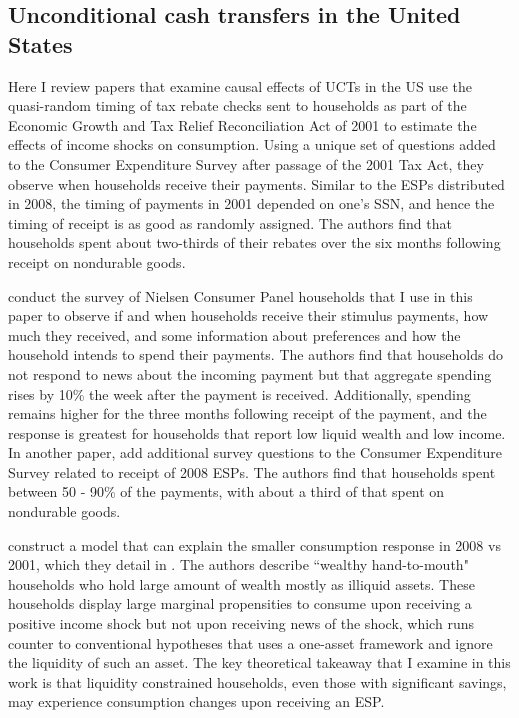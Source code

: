 \documentclass[12pt]{article}
\begin{document}
\subsection{Unconditional cash transfers in the United States}

Here I review papers that examine causal effects of UCTs in the US \textcite{johnson2006household} use the quasi-random timing of tax rebate checks sent to households as part of the Economic Growth and Tax Relief Reconciliation Act of 2001 to estimate the effects of income shocks on consumption.
Using a unique set of questions added to the Consumer Expenditure Survey after passage of the 2001 Tax Act, they observe when households receive their payments.
Similar to the ESPs distributed in 2008, the timing of payments in 2001 depended on one's SSN, and hence the timing of receipt is as good as randomly assigned.
The authors find that households spent about two-thirds of their rebates over the six months following receipt on nondurable goods.

\textcite{broda2014economic} conduct the survey of Nielsen Consumer Panel households that I use in this paper to observe if and when households receive their stimulus payments, how much they received, and some information about preferences and how the household intends to spend their payments.
The authors find that households do not respond to news about the incoming payment but that aggregate spending rises by 10\% the week after the payment is received.
Additionally, spending remains higher for the three months following receipt of the payment, and the response is greatest for households that report low liquid wealth and low income.
In another paper, \textcite{parker2013consumer} add additional survey questions to the Consumer Expenditure Survey related to receipt of 2008 ESPs.
The authors find that households spent between 50 - 90\% of the payments, with about a third of that spent on nondurable goods.

\textcite{kaplan2014model} construct a model that can explain the smaller consumption response in 2008 vs 2001, which they detail in \textcite{kaplan2014tale}.
The authors describe ``wealthy hand-to-mouth" households who hold large amount of wealth mostly as illiquid assets.
These households display large marginal propensities to consume upon receiving a positive income shock but not upon receiving news of the shock, which runs counter to conventional hypotheses that uses a one-asset framework and ignore the liquidity of such an asset.
The key theoretical takeaway that I examine in this work is that liquidity constrained households, even those with significant savings, may experience consumption changes upon receiving an ESP.
\end{document}
